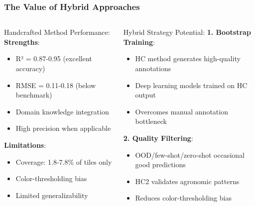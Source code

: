 \documentclass[aspectratio=43]{beamer}
\begin{document}
\begin{frame}
    \frametitle{The Value of Hybrid Approaches}
    
    \begin{columns}
        \begin{column}{0.5\textwidth}
            \begin{block}{Handcrafted Method Performance:}
                \small
                \textbf{Strengths}:
                \begin{itemize}
                    \item R² = 0.87-0.95 (excellent accuracy)
                    \item RMSE = 0.11-0.18 (below benchmark)
                    \item Domain knowledge integration
                    \item High precision when applicable
                \end{itemize}
                
                \textbf{Limitations}:
                \begin{itemize}
                    \item Coverage: 1.8-7.8\% of tiles only
                    \item Color-thresholding bias
                    \item Limited generalizability
                \end{itemize}
            \end{block}
        \end{column}
        
        \begin{column}{0.5\textwidth}
            \begin{exampleblock}{Hybrid Strategy Potential:}
                \small
                \textbf{1. Bootstrap Training}:
                \begin{itemize}
                    \item HC method generates high-quality annotations
                    \item Deep learning models trained on HC output
                    \item Overcomes manual annotation bottleneck
                \end{itemize}
                
                \textbf{2. Quality Filtering}:
                \begin{itemize}
                    \item OOD/few-shot/zero-shot occasional good predictions
                    \item HC2 validates agronomic patterns
                    \item Reduces color-thresholding bias
                \end{itemize}
            \end{exampleblock}
        \end{column}
    \end{columns}
    

\end{frame}
\end{document}
